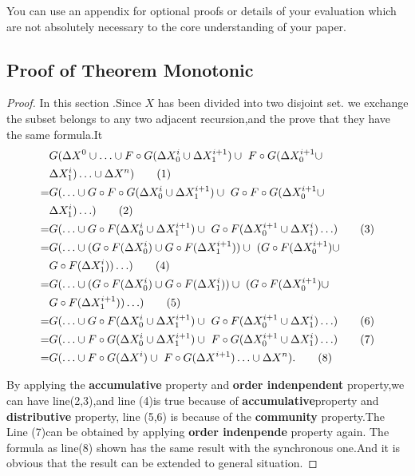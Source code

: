 \documentclass{vldb}
\begin{document}
\begin{appendix}
You can use an appendix for optional proofs or details of your evaluation which are not absolutely necessary to the core understanding of your paper.
\subsection{Proof of Theorem Monotonic}
 \begin{proof}
 In this section .Since $X$ has been divided into two disjoint set. we exchange the subset belongs to any two adjacent recursion,and the prove that they have the same formula.It
 \begin{align}
 &G(\Delta X^0\cup \ldots \cup F\circ G(\Delta X^i_0 \cup \Delta X^{i+1}_1)\cup\ F\circ G(\Delta X^{i+1}_0 \cup \notag\\ &\Delta X^{i}_1) \ldots\cup \Delta X^n)\tag{1} \\
 =&G( \ldots \cup G \circ F\circ G(\Delta X^i_0 \cup \Delta X^{i+1}_1)\cup\ G \circ F\circ G(\Delta X^{i+1}_0 \cup \notag\\ &\Delta X^{i}_1) \ldots)\tag{2} \\
 =&G( \ldots \cup G \circ F(\Delta X^i_0 \cup \Delta X^{i+1}_1)\cup\ G \circ F(\Delta X^{i+1}_0 \cup \Delta X^{i}_1) \ldots)\tag{3} \\
  =&G( \ldots \cup (G\circ F(\Delta X^i_0) \cup G\circ F(\Delta X^{i+1}_1))\cup\ (G \circ F(\Delta X^{i+1}_0) \cup \notag\\ &G \circ F(\Delta X^{i}_1)) \ldots )\tag{4} \\
  =&G( \ldots \cup (G\circ F(\Delta X^i_0) \cup G\circ F(\Delta X^{i}_1))\cup\ (G \circ F(\Delta X^{i+1}_0) \cup \notag\\ &G \circ F(\Delta X^{i+1}_1)) \ldots )\tag{5} \\
  =&G( \ldots \cup G \circ F(\Delta X^i_0 \cup \Delta X^{i+1}_1)\cup\ G \circ F(\Delta X^{i+1}_0 \cup \Delta X^{i}_1) \ldots)\tag{6} \\
  =&G( \ldots \cup F \circ G(\Delta X^i_0 \cup \Delta X^{i+1}_1)\cup\ F \circ G(\Delta X^{i+1}_0 \cup \Delta X^{i}_1) \ldots)\tag{7} \\
=&G(\ldots \cup F \circ G(\Delta X^i)\cup\ F \circ G(\Delta X^{i+1}) \ldots\cup \Delta X^n).\tag{8}
 \end{align}

By applying the \textbf{accumulative} property and \textbf{order indenpendent} property,we can have line(2,3),and line (4)is true because of \textbf{accumulative}property
and \textbf{distributive} property, line (5,6) is because of the \textbf{community} property.The Line (7)can be obtained by applying \textbf{order indenpende} property again.
The formula as line(8) shown has the same result with the synchronous one.And it is obvious that the result can be extended to general situation.
 \end{proof}

\end{appendix}
\end{document}
